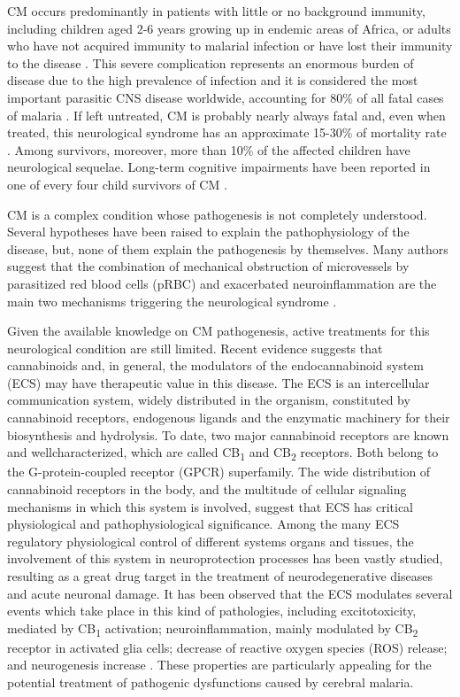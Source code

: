 \documentclass[empirical, authordate]{jote-new-article}
\begin{document}
CM occurs predominantly in patients with little or no background immunity, including children aged 2-6 years growing up in endemic areas of Africa, or adults who have not acquired immunity to malarial infection or have lost their immunity to the disease \parencite{Grau1987}. This severe complication represents an enormous burden of disease due to the high prevalence of infection \parencite{Medana2006} and it is considered the most important parasitic CNS disease worldwide, accounting for 80\% of all fatal cases of malaria \parencite{Linares2013}. If left untreated, CM is probably nearly always fatal and, even when treated, this neurological syndrome has an approximate 15-30\% of mortality rate \parencite{Bartoloni2012}. Among survivors, moreover, more than 10\% of the affected children have neurological sequelae. Long-term cognitive impairments have been reported in one of every four child survivors of CM \parencite{Mariotti2011}.

CM is a complex condition whose pathogenesis is not completely understood. Several hypotheses have been raised to explain the pathophysiology of the disease, but, none of them explain the pathogenesis by themselves. Many authors suggest that the combination of mechanical obstruction of microvessels by parasitized red blood cells (pRBC) and exacerbated neuroinflammation are the main two mechanisms triggering the neurological syndrome \parencite{Combes2006}.

Given the available knowledge on CM pathogenesis, active treatments for this neurological condition are still limited. Recent evidence suggests that cannabinoids and, in general, the modulators of the endocannabinoid system (ECS) may have therapeutic value in this disease. The ECS is an intercellular communication system, widely distributed in the organism, constituted by cannabinoid receptors, endogenous ligands and the enzymatic machinery for their biosynthesis and hydrolysis. To date, two major cannabinoid receptors are known and wellcharacterized, which are called CB\textsubscript{1} and CB\textsubscript{2} receptors. Both belong to the G-protein-coupled receptor (GPCR) superfamily. The wide distribution of cannabinoid receptors in the body, and the multitude of cellular signaling mechanisms in which this system is involved, suggest that ECS has critical physiological and pathophysiological significance. Among the many ECS regulatory physiological control of different systems organs and tissues, the involvement of this system in neuroprotection processes has been vastly studied, resulting as a great drug target in the treatment of neurodegenerative diseases and acute neuronal damage. It has been observed that the ECS modulates several events which take place in this kind of pathologies, including excitotoxicity, mediated by CB\textsubscript{1} activation; neuroinflammation, mainly modulated by CB\textsubscript{2} receptor in activated glia cells; decrease of reactive oxygen species (ROS) release; and neurogenesis increase \parencite{Fogaça2013}. These properties are particularly appealing for the potential treatment of pathogenic dysfunctions caused by cerebral malaria.
\end{document}
